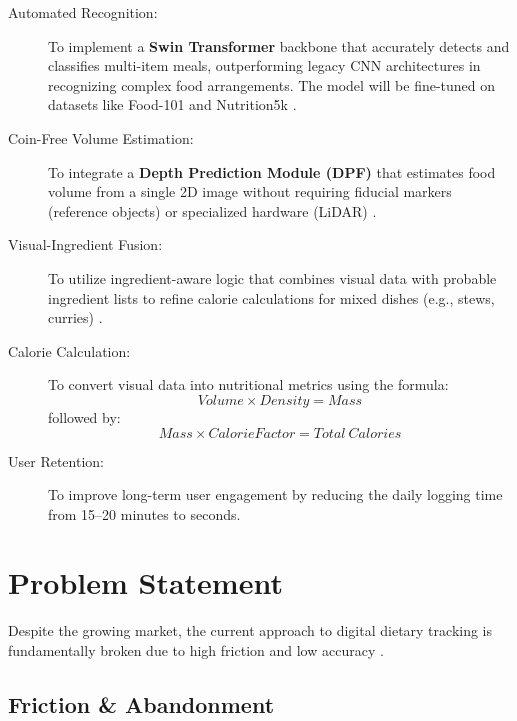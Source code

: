 \documentclass[fleqn,10pt]{SelfArx} %
\begin{document}
\begin{description}
    \item[Automated Recognition:] To implement a \textbf{Swin Transformer} backbone that accurately detects and classifies multi-item meals, outperforming legacy CNN architectures in recognizing complex food arrangements. The model will be fine-tuned on datasets like Food-101 and Nutrition5k \cite{wang2024swin}.

    \item[Coin-Free Volume Estimation:] To integrate a \textbf{Depth Prediction Module (DPF)} that estimates food volume from a single 2D image without requiring fiducial markers (reference objects) or specialized hardware (LiDAR) \cite{han2023dpf}.

    \item[Visual-Ingredient Fusion:] To utilize ingredient-aware logic that combines visual data with probable ingredient lists to refine calorie calculations for mixed dishes (e.g., stews, curries) \cite{qi2025vif}.

    \item[Calorie Calculation:] To convert visual data into nutritional metrics using the formula:
          \begin{equation}
              Volume \times Density = Mass
              \label{eq:mass}
          \end{equation}
          followed by:
          \begin{equation}
              Mass \times CalorieFactor = Total\ Calories
              \label{eq:calories}
          \end{equation}

    \item[User Retention:] To improve long-term user engagement by reducing the daily logging time from 15--20 minutes to seconds.
\end{description}


\section{Problem Statement}

Despite the growing market, the current approach to digital dietary tracking is fundamentally broken due to high friction and low accuracy \cite{lifehacker2024, portionsmaster2024}.

\subsection{Friction \& Abandonment}
\end{document}
